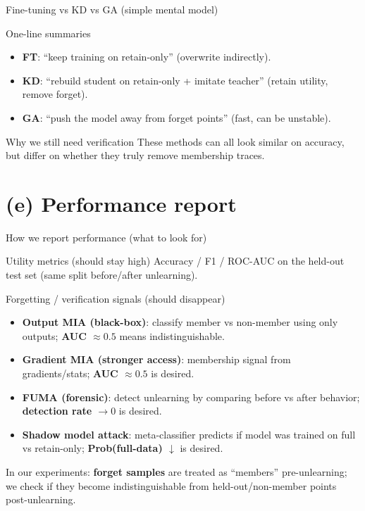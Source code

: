 \documentclass[aspectratio=169, 11pt]{beamer}
\begin{document}
\begin{frame}{Fine-tuning vs KD vs GA (simple mental model)}
  \begin{block}{One-line summaries}
    \begin{itemize}
      \item \textbf{FT}: ``keep training on retain-only'' (overwrite indirectly).
      \item \textbf{KD}: ``rebuild student on retain-only + imitate teacher'' (retain utility, remove forget).
      \item \textbf{GA}: ``push the model away from forget points'' (fast, can be unstable).
    \end{itemize}
  \end{block}
  \vspace{0.6em}
  \begin{alertblock}{Why we still need verification}
    These methods can all look similar on accuracy, but differ on whether they truly remove membership traces.
  \end{alertblock}
\end{frame}

\section{(e) Performance report}

\begin{frame}{How we report performance (what to look for)}
  \begin{block}{Utility metrics (should stay high)}
    Accuracy / F1 / ROC-AUC on the held-out test set (same split before/after unlearning).
  \end{block}
  \vspace{0.6em}
  \begin{alertblock}{Forgetting / verification signals (should disappear)}
    \begin{itemize}
      \item \textbf{Output MIA (black-box)}: classify member vs non-member using only outputs; \textbf{AUC \(\approx 0.5\)} means indistinguishable.
      \item \textbf{Gradient MIA (stronger access)}: membership signal from gradients/stats; \textbf{AUC \(\approx 0.5\)} is desired.
      \item \textbf{FUMA (forensic)}: detect unlearning by comparing before vs after behavior; \textbf{detection rate \(\rightarrow 0\)} is desired.
      \item \textbf{Shadow model attack}: meta-classifier predicts if model was trained on full vs retain-only; \textbf{Prob(full-data) \(\downarrow\)} is desired.
    \end{itemize}
  \end{alertblock}
  \vspace{0.2em}
  \small In our experiments: \textbf{forget samples} are treated as ``members'' pre-unlearning; we check if they become indistinguishable from held-out/non-member points post-unlearning.
\end{frame}
\end{document}
